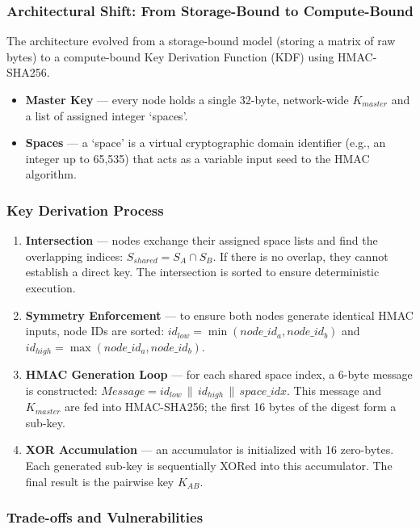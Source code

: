 \documentclass[11pt,a4paper]{article}
\newcommand{\citeref}[1]{}
\begin{document}
\subsubsection*{Architectural Shift: From Storage-Bound to Compute-Bound}

The architecture evolved from a storage-bound model (storing a matrix of raw bytes) to a compute-bound Key Derivation Function (KDF) using HMAC-SHA256.\citeref{4}

\begin{itemize}
\item \textbf{Master Key} --- every node holds a single 32-byte, network-wide $K_{master}$ and a list of assigned integer `spaces'.
\item \textbf{Spaces} --- a `space' is a virtual cryptographic domain identifier (e.g., an integer up to 65{,}535) that acts as a variable input seed to the HMAC algorithm.
\end{itemize}

\subsubsection*{Key Derivation Process}

\begin{enumerate}
\item \textbf{Intersection} --- nodes exchange their assigned space lists and find the overlapping indices: $S_{shared} = S_A \cap S_B$. If there is no overlap, they cannot establish a direct key. The intersection is sorted to ensure deterministic execution.
\item \textbf{Symmetry Enforcement} --- to ensure both nodes generate identical HMAC inputs, node IDs are sorted: $id_{low} = \min(node\_id_a, node\_id_b)$ and $id_{high} = \max(node\_id_a, node\_id_b)$.
\item \textbf{HMAC Generation Loop} --- for each shared space index, a 6-byte message is constructed: $Message = id_{low} \,\|\, id_{high} \,\|\, space\_idx$. This message and $K_{master}$ are fed into HMAC-SHA256; the first 16 bytes of the digest form a sub-key.
\item \textbf{XOR Accumulation} --- an accumulator is initialized with 16 zero-bytes. Each generated sub-key is sequentially XORed into this accumulator. The final result is the pairwise key $K_{AB}$.
\end{enumerate}

\subsubsection*{Trade-offs and Vulnerabilities}
\end{document}
